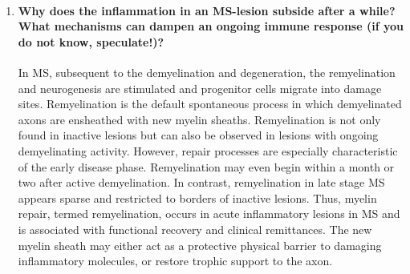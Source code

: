 \documentclass[12pt,article,oneside,a4paper]{memoir}
\begin{document}
\begin{enumerate}
\item \paragraph{Why does the inflammation in an MS-lesion subside after a while?
What mechanisms can dampen an ongoing immune response (if you do not know,
speculate!)?}

In MS, subsequent to the demyelination and degeneration, the remyelination and
neurogenesis are stimulated and progenitor cells migrate into damage sites.
Remyelination is the default spontaneous process in which demyelinated axons
are ensheathed with new myelin sheaths.
Remyelination is not only found in inactive lesions but can also be observed in
lesions with ongoing demyelinating activity. However, repair processes are
especially characteristic of the early disease phase. Remyelination may even
begin within a month or two after active demyelination. In contrast,
remyelination in late stage MS appears sparse and restricted to borders of
inactive lesions. Thus, myelin repair, termed remyelination, occurs in acute
inflammatory lesions in MS and is associated with functional recovery and
clinical remittances. The new myelin sheath may either act as a protective
physical barrier to damaging inflammatory molecules, or restore trophic support
to the axon.

\end{enumerate}

\end{document}
